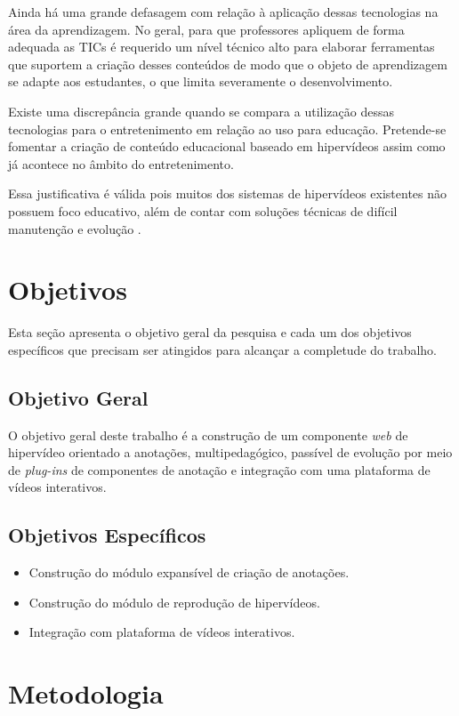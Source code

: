 Ainda há uma grande defasagem com relação à aplicação dessas tecnologias na área da aprendizagem. No geral, para que professores apliquem de forma adequada as TICs é requerido um nível técnico alto para elaborar ferramentas que suportem a criação desses conteúdos de modo que o objeto de aprendizagem se adapte aos estudantes, o que limita severamente o desenvolvimento.

Existe uma discrepância grande quando se compara a utilização dessas tecnologias para o entretenimento em relação ao uso para educação. Pretende-se fomentar a criação de conteúdo educacional baseado em hipervídeos assim como já acontece no âmbito do entretenimento.

Essa justificativa é válida pois muitos dos sistemas de hipervídeos existentes não possuem foco educativo, além de contar com soluções técnicas de difícil manutenção e evolução \cite{sadallah2012}.

\section{Objetivos}

Esta seção apresenta o objetivo geral da pesquisa e cada um dos objetivos específicos que precisam ser atingidos para alcançar a completude do trabalho.

\subsection{Objetivo Geral}

O objetivo geral deste trabalho é a construção de um componente \textit{web} de hipervídeo orientado a anotações, multipedagógico, passível de evolução por meio de \textit{plug-ins} de componentes de anotação e integração com uma plataforma de vídeos interativos.

\subsection{Objetivos Específicos}

\begin{itemize}
	\item Construção do módulo expansível de criação de anotações.
	\item Construção do módulo de reprodução de hipervídeos.
	\item Integração com plataforma de vídeos interativos.
\end{itemize}

\section{Metodologia}

